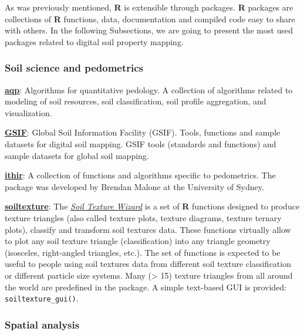 \documentclass[
  10pt,
  b5paper,
  oneside]{book}
\theoremstyle{definition}
\theoremstyle{definition}
\theoremstyle{definition}
\theoremstyle{definition}
\theoremstyle{remark}
\begin{document}
As was previously mentioned, \textbf{R} is extensible through packages. \textbf{R} packages are collections of \textbf{R} functions, data, documentation and compiled code easy to share with others. In the following Subsections, we are going to present the most used packages related to digital soil property mapping.

\hypertarget{SoilPedometrics}{%
\subsubsection{Soil science and pedometrics}\label{SoilPedometrics}}

\href{https://CRAN.R-project.org/package=aqp}{\textbf{aqp}}: Algorithms for quantitative pedology. A collection of algorithms related to modeling of soil resources, soil classification, soil profile aggregation, and visualization.

\href{https://CRAN.R-project.org/package=GSIF}{\textbf{GSIF}}: Global Soil Information Facility (GSIF). Tools, functions and sample datasets for digital soil mapping. GSIF tools (standards and functions) and sample datasets for global soil mapping.

\href{http://ithir.r-forge.r-project.org/}{\textbf{ithir}}: A collection of functions and algorithms specific to pedometrics. The package was developed by Brendan Malone at the University of Sydney.

\href{https://CRAN.R-project.org/package=soiltexture}{\textbf{soiltexture}}: The \href{https://cran.r-project.org/web/packages/soiltexture/vignettes/soiltexture_vignette.pdf}{\emph{Soil Texture Wizard}} is a set of \textbf{R} functions designed to produce texture triangles (also called texture plots, texture diagrams, texture ternary plots), classify and transform soil textures data. These functions virtually allow to plot any soil texture triangle (classification) into any triangle geometry (isosceles, right-angled triangles, etc.). The set of functions is expected to be useful to people using soil textures data from different soil texture classification or different particle size systems. Many (\textgreater{} 15) texture triangles from all around the world are predefined in the package. A simple text-based GUI is provided: \texttt{soiltexture\_gui()}.

\hypertarget{spatial-analysis}{%
\subsubsection{Spatial analysis}\label{spatial-analysis}}
\end{document}
